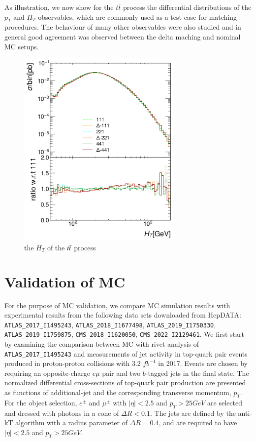 \documentclass[NOTE, REPORT=true, atlasdraft=true, USenglish]{atlasdoc}
\begin{document}
As illustration, we now show for the $t\bar{t}$ process the differential distributions of the $p_T$ and $H_T$ observables, which are commonly used as a test case for matching procedures. The behaviour of many other observables were also studied and in general good agreement was observed between the delta maching and nominal MC setups.

\begin{figure}[t]
\includegraphics[width=8cm]{plots/NWF_ttbar_folding_HT.png}
\centering
\caption{the $H_T$ of the $t\Bar{t}$ process}
\end{figure}


\section{Validation of MC}

For the purpose of MC validation, we compare MC simulation results with experimental results from the following data sets downloaded from HepDATA: \texttt{ATLAS\_2017\_I1495243}\cite{ATLAS_2017_I1495243}, \texttt{ATLAS\_2018\_I1677498}\cite{ATLAS_2018_I1677498}, \texttt{ATLAS\_2019\_I1750330}\cite{ATLAS_2019_I1750330}, \texttt{ATLAS\_2019\_I1759875}\cite{ATLAS_2019_I1759875}, \texttt{CMS\_2018\_I1620050}\cite{CMS_2018_I1620050}, \texttt{CMS\_2022\_I2129461}\cite{CMS_2022_I2129461}. We first start by examining the comparison between MC with rivet analysis of \texttt{ATLAS\_2017\_I1495243}\cite{ATLAS:2017qjg} and measurements of jet activity in top-quark pair events produced in proton-proton collisions with 3.2 $fb^{-1}$ in 2017. Events are chosen by requiring an opposite-charge $e\mu$ pair and two $b$-tagged jets in the final state. The normalized differential cross-sections of top-quark pair production are presented as functions of additional-jet and the corresponding transverse momentum, $p_T$. For the object selection, $e^\pm$ and $\mu^\pm$ with $|\eta|<2.5$ and $p_T>25GeV$ are selected and dressed with photons in a cone of $\Delta R<0.1$. The jets are defined by the anti-kT algorithm with a radius parameter of $\Delta R=0.4$, and are required to have $|\eta|<2.5$ and $p_T>25GeV$. 
\end{document}
